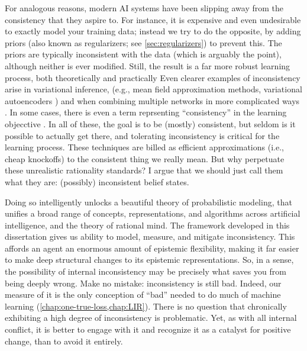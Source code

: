 For analogous reasons, modern AI systems have been slipping away from the consistency that they aspire to.
For instance, it is expensive and even undesirable to exactly model your training data; instead we try to do the opposite, by adding priors (also known as regularizers; see \cref{sec:regularizers}) to prevent this.
The priors are typically inconsistent with the data (which is arguably the point), although neither is ever modified. 
Still, the result is a far more robust learning process, both theoretically \cite{ftrl} and practically \cite{regularizers}
%
Even clearer examples of inconsistency arise in variational inference,
    (e.g., mean field approximation methods, variational autoencoders \cite{kingma2013autoencoding})
    and when combining multiple networks 
        in more complicated ways \cite{}.
    In some cases, there is even a term reprsenting ``consistency'' in the learning objecctive \cite{cycle-gan}. 
In all of these, the goal is to be (mostly) consistent, but seldom is it possible to actually get there,
and tolerating inconsistency is critical for the learning process.
%
These techniques are billed
as efficient approximations (i.e., cheap knockoffs) to the consistent thing we really mean.
But why perpetuate these unrealistic rationality standards?
I argue that we should just call them what they are: (possibly) inconsistent belief states.

Doing so intelligently unlocks a beautiful theory of probabilistic modeling, that unifies a broad range of concepts, representations, and algorithms across artificial intelligence, and the theory of rational mind. 
The framework developed in this dissertation
gives us
ability to model, measure, and mitigate inconsistency.
This affords an agent an enormous amount of epistemic flexibility,
    making it far easier to make deep structural changes to its epistemic
    representations.
So, in a sense, the possibility of internal inconsistency may be precisely what saves you from being deeply wrong. 
%
Make no mistake: inconsistency is still bad.
Indeed, our measure of it is the only conception of ``bad'' needed to do much of machine learning (\cref{chap:one-true-loss,chap:LIR}).
There is no question that chronically exhibiting a high degree of inconsistency is problematic.
%
Yet, as with all internal conflict, it is better to engage with it and recognize it as a catalyst for positive change, 
than to avoid it entirely. 

